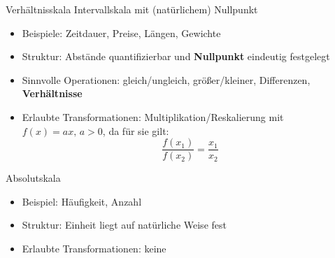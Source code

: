 \documentclass[
  10pt,
  ignorenonframetext,
]{beamer}
\providecommand{\tightlist}{%
  \setlength{\itemsep}{0pt}\setlength{\parskip}{0pt}}
\begin{document}
\begin{frame}{Verhältnisskala}
\protect\hypertarget{verhuxe4ltnisskala}{}
Intervallskala mit (natürlichem) Nullpunkt

\begin{itemize}
\tightlist
\item
  Beispiele: Zeitdauer, Preise, Längen, Gewichte
\item
  Struktur: Abstände quantifizierbar und \textbf{Nullpunkt} eindeutig
  festgelegt
\item
  Sinnvolle Operationen: gleich/ungleich, größer/kleiner, Differenzen,
  \textbf{Verhältnisse}
\item
  Erlaubte Transformationen: Multiplikation/Reskalierung mit
  \(f(x) = ax,\, a > 0\), da für sie gilt: \begin{equation*}
               \frac{f(x_1)}{f(x_2)} = \frac{x_1}{x_2}
           \end{equation*}
\end{itemize}
\end{frame}

\begin{frame}{Absolutskala}
\protect\hypertarget{absolutskala}{}
\begin{itemize}
\tightlist
\item
  Beispiel: Häufigkeit, Anzahl
\item
  Struktur: Einheit liegt auf natürliche Weise fest
\item
  Erlaubte Transformationen: keine
\end{itemize}
\end{frame}
\end{document}
